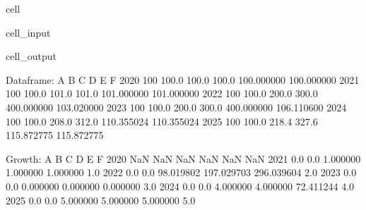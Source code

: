 \documentclass[letterpaper,10pt,english]{jupyterBook}
\begin{document}
\begin{sphinxuseclass}{cell}\begin{sphinxVerbatimInput}

\begin{sphinxuseclass}{cell_input}
\begin{sphinxVerbatim}[commandchars=\\\{\}]
  
\end{sphinxVerbatim}

\end{sphinxuseclass}\end{sphinxVerbatimInput}
\begin{sphinxVerbatimOutput}

\begin{sphinxuseclass}{cell_output}
\begin{sphinxVerbatim}[commandchars=\\\{\}]
Dataframe:
        A      B      C      D           E           F
2020  100  100.0  100.0  100.0  100.000000  100.000000
2021  100  100.0  101.0  101.0  101.000000  101.000000
2022  100  100.0  200.0  300.0  400.000000  103.020000
2023  100  100.0  200.0  300.0  400.000000  106.110600
2024  100  100.0  208.0  312.0  110.355024  110.355024
2025  100  100.0  218.4  327.6  115.872775  115.872775

Growth:
        A    B          C           D           E    F
2020  NaN  NaN        NaN         NaN         NaN  NaN
2021  0.0  0.0   1.000000    1.000000    1.000000  1.0
2022  0.0  0.0  98.019802  197.029703  296.039604  2.0
2023  0.0  0.0   0.000000    0.000000    0.000000  3.0
2024  0.0  0.0   4.000000    4.000000  \PYGZhy{}72.411244  4.0
2025  0.0  0.0   5.000000    5.000000    5.000000  5.0
\end{sphinxVerbatim}

\end{sphinxuseclass}\end{sphinxVerbatimOutput}

\end{sphinxuseclass}
\end{document}
